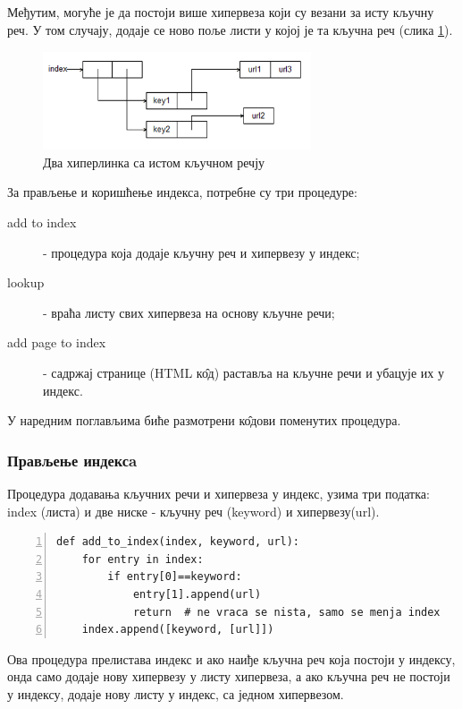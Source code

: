Међутим, могуће је да постоји више хипервеза који су везани за исту кључну реч. У том случају, додаје се ново поље листи у којој је та кључна реч (слика \ref{slike:index3}).

\begin{figure}[here]
\centering
\includegraphics[height=110px, width=300px]{index3.png}
\caption{Два хиперлинка са истом кључном речју}
\label{slike:index3}
\end{figure}

За прављење и коришћење индекса, потребне су три процедуре:

\begin{description}
\item[add to index] - процедура која додаје кључну реч и хипервезу у индекс;
\item[lookup] - враћа листу свих хипервеза на основу кључне речи;
\item[add page to index] - садржај странице (HTML к\^{о}д) раставља на кључне речи и убацује их у индекс.
\end{description}

У наредним поглављима биће размотрени к\^{о}дови поменутих процедура.

\subsubsection{Прављење индексa}

Процедура додавања кључних речи и хипервеза у индекс, узима три податка: index (листа) и две ниске - кључну реч (keyword) и хипервезу(url).

\begin{lstlisting}[caption=Процедура add\_to\_index, label={lst:addtoindex}, numbers=left]
def add_to_index(index, keyword, url):
    for entry in index:
        if entry[0]==keyword:
            entry[1].append(url)
            return  # ne vraca se nista, samo se menja index
    index.append([keyword, [url]])
\end{lstlisting}

Ова процедура прелистава индекс и ако наиђе кључна реч која постоји у индексу, онда само додаје нову хипервезу у листу хипервеза, а ако кључна реч не постоји у индексу, додаје нову листу у индекс, са једном хипервезом.


